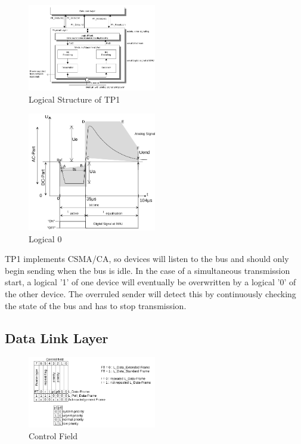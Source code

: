 \begin{figure}
    \centering
    \includegraphics[width=0.5\textwidth]{figures/tp1-structure.png}
    \caption{Logical Structure of TP1}
    \label{fig:tp1}
\end{figure}

\begin{figure}
    \centering
    \includegraphics[width=0.5\textwidth]{figures/tp1-low.png}
    \caption{Logical 0}
    \label{fig:low}
\end{figure}

TP1 implements CSMA/CA, so devices will listen to the bus and should only begin sending
when the bus is idle. In the case of a simultaneous transmission start, a logical '1' of one
device will eventually be overwritten by a logical '0' of the other device. The overruled
sender will detect this by continuously checking the state of the bus and has to stop 
transmission.

\subsection{Data Link Layer}

\begin{figure}
    \centering
    \includegraphics[width=0.5\textwidth]{figures/controlfield.png}
    \caption{Control Field}
    \label{fig:ctrlfield}
\end{figure}

